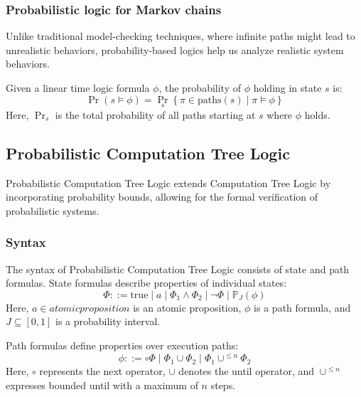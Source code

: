 \subsubsection{Probabilistic logic for Markov chains}
Unlike traditional model-checking techniques, where infinite paths might lead to unrealistic behaviors, probability-based logics help us analyze realistic system behaviors.

Given a linear time logic formula $\phi$, the probability of $\phi$ holding in state $s$ is:
\[\Pr(s\models\phi)=\Pr_s\left\{\pi\in\text{paths}(s)\mid\pi\models\phi\right\}\]
Here, $\Pr_s$ is the total probability of all paths starting at $s$ where $\phi$ holds.

\subsection{Probabilistic Computation Tree Logic}
Probabilistic Computation Tree Logic extends Computation Tree Logic by incorporating probability bounds, allowing for the formal verification of probabilistic systems.

\subsubsection{Syntax}
The syntax of Probabilistic Computation Tree Logic consists of state and path formulas. 
State formulas describe properties of individual states:
\[\Phi::=\text{true}\mid a\mid \Phi_1\land\Phi_2\mid\lnot\Phi\mid\mathbb{P}_J(\phi)\]
\noindent Here, $a \in atomic proposition$ is an atomic proposition, $\phi$ is a path formula, and $J \subseteq [0, 1]$ is a probability interval.

Path formulas define properties over execution paths:
\[\phi::=\circ\Phi\mid\Phi_1\cup\Phi_2\mid\Phi_1\cup^{\leq n}\Phi_2\]
\noindent Here, $\circ$ represents the next operator, $\cup$ denotes the until operator, and $\cup^{\leq n}$ expresses bounded until with a maximum of $n$ steps.

